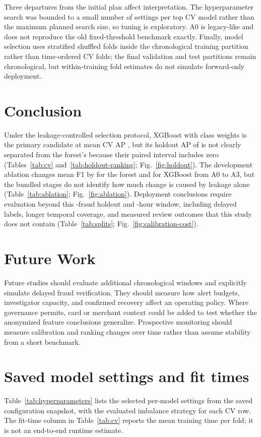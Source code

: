 \documentclass[journal]{IEEEtran}
\begin{document}
Three departures from the initial plan affect interpretation. The hyperparameter search was bounded to a small number of settings per top CV model rather than the maximum planned search size, so tuning is exploratory. A0 is legacy-like and does not reproduce the old fixed-threshold benchmark exactly. Finally, model selection uses stratified shuffled folds inside the chronological training partition rather than time-ordered CV folds; the final validation and test partitions remain chronological, but within-training fold estimates do not simulate forward-only deployment.
\FloatBarrier

\section{Conclusion}
\label{sec:conclusion}
Under the leakage-controlled selection protocol, XGBoost with class weights is the primary candidate at mean CV AP \PrimaryCVAP{}, but its holdout AP of \XgbWeightsAP{} is not clearly separated from the forest's \RfSmoteAP{} because their paired interval includes zero (Tables~\ref{tab:cv} and~\ref{tab:holdout-ranking}; Fig.~\ref{fig:holdout}). The development ablation changes mean F1 by \RFAblationDrop{} for the forest and \XGBAblationDrop{} for XGBoost from A0 to A3, but the bundled stages do not identify how much change is caused by leakage alone (Table~\ref{tab:ablation}; Fig.~\ref{fig:ablation}). Deployment conclusions require evaluation beyond this \TestFraudCount{}-fraud holdout and \TimeSpanHours{}-hour window, including delayed labels, longer temporal coverage, and measured review outcomes that this study does not contain (Table~\ref{tab:splits}; Fig.~\ref{fig:calibration-cost}).
\FloatBarrier

\section{Future Work}
\label{sec:future}
Future studies should evaluate additional chronological windows and explicitly simulate delayed fraud verification. They should measure how alert budgets, investigator capacity, and confirmed recovery affect an operating policy. Where governance permits, card or merchant context could be added to test whether the anonymized feature conclusions generalize. Prospective monitoring should measure calibration and ranking changes over time rather than assume stability from a short benchmark.
\FloatBarrier

\appendices
\section{Saved model settings and fit times}
\label{app:settings}
Table~\ref{tab:hyperparameters} lists the selected per-model settings from the saved configuration snapshot, with the evaluated imbalance strategy for each CV row. The fit-time column in Table~\ref{tab:cv} reports the mean training time per fold; it is not an end-to-end runtime estimate.
\begin{table}[!t]
\centering
\caption{Saved model settings for each evaluated model-strategy pair.}
\label{tab:hyperparameters}

\end{table}
\FloatBarrier



\end{document}
